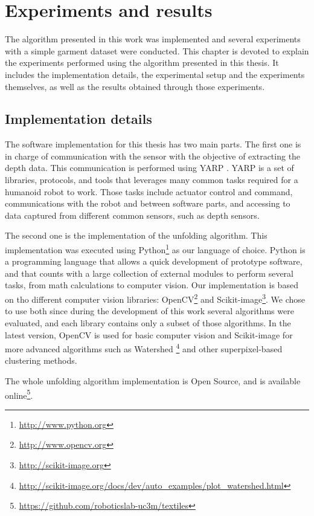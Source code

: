 \chapter{Experiments and results}
\label{experiments_and_results}

The algorithm presented in this work was implemented and several experiments with a simple garment dataset were conducted. This chapter is devoted to explain the experiments performed using the algorithm presented in this thesis. It includes the implementation details, the experimental setup and the experiments themselves, as well as the results obtained through those experiments.

\section{Implementation details}
\label{experiments:implementation}
The software implementation for this thesis has two main parts. The first one is in charge of communication with the sensor with the objective of extracting the depth data. This communication is performed using YARP \cite{metta2006yarp}. YARP is a set of libraries, protocols, and tools that leverages many common tasks required for a humanoid robot to work. Those tasks include actuator control and command, communications with the robot and between software parts, and accessing to data captured from different common sensors, such as depth sensors.

The second one is the implementation of the unfolding algorithm. This implementation was executed using Python\footnote{\url{http://www.python.org}} as our language of choice. Python is a programming language that allows a quick development of prototype software, and that counts with a large collection of external modules to perform several tasks, from math calculations to computer vision. Our implementation is based on tho different computer vision libraries: OpenCV\footnote{\url{http://www.opencv.org}} and Scikit-image\footnote{\url{http://scikit-image.org}}. We chose to use both since during the development of this work several algorithms were evaluated, and each library contains only a subset of those algorithms. In the latest version, OpenCV is used for basic computer vision and Scikit-image for more advanced algorithms such as Watershed \footnote{\url{http://scikit-image.org/docs/dev/auto_examples/plot_watershed.html}} and other superpixel-based clustering methods. 

The whole unfolding algorithm implementation is Open Source, and is available online\footnote{\url{https://github.com/roboticslab-uc3m/textiles}}.

